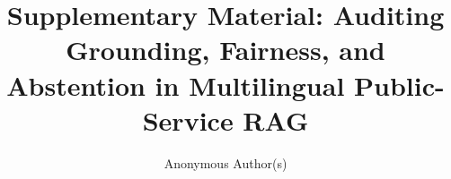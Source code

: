\documentclass[sigconf,anonymous,review,nonacm]{acmart}
\begin{document}
\title{Supplementary Material: Auditing Grounding, Fairness, and Abstention in Multilingual Public-Service RAG}

\author{Anonymous Author(s)}


\end{document}
